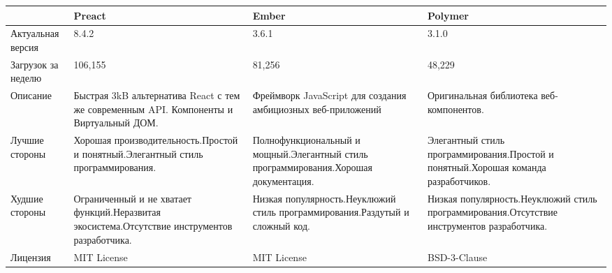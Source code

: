 \begin{table}[H]
  \small
  \begin{tabularx}{\textwidth}{| p{2cm} | X | X | X |}
  \hline
  & Preact
  & Ember
  & Polymer \\
  \hline Актуальная версия
  & 8.4.2
  & 3.6.1
  & 3.1.0 \\
  \hline Загрузок за неделю
  & 106,155
  & 81,256
  & 48,229 \\
  \hline Описание
  & Быстрая 3kB альтернатива React с тем же современным API. Компоненты и Виртуальный ДОМ.
  & Фреймворк JavaScript для создания амбициозных веб-приложений
  & Оригинальная библиотека веб-компонентов. \\
  \hline Лучшие стороны
  & Хорошая производительность.\newline Простой и понятный.\newline Элегантный стиль программирования.
  & Полнофункциональный и мощный.\newline Элегантный стиль программирования.\newline Хорошая документация.
  & Элегантный стиль программирования.\newline Простой и понятный.\newline Хорошая команда разработчиков. \\
  \hline Худшие стороны
  & Ограниченный и не хватает функций.\newline Неразвитая экосистема.\newline Отсутствие инструментов разработчика.
  & Низкая популярность.\newline Неуклюжий стиль программирования.\newline Раздутый и сложный код.
  & Низкая популярность.\newline Неуклюжий стиль программирования.\newline Отсутствие инструментов разработчика. \\
  \hline Лицензия
  & MIT License
  & MIT License
  & BSD-3-Clause \\
  \hline
  \end{tabularx}
\end{table}
